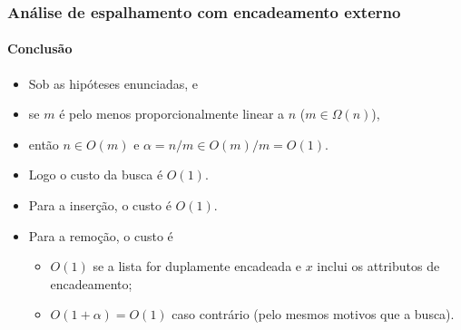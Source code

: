 \documentclass{beamer}
\begin{document}
\begin{frame}

  \frametitle{Análise de espalhamento com encadeamento externo}
  \framesubtitle{Conclusão}

  \begin{itemize}

  \item Sob as hipóteses enunciadas, e

  \item se $m$ é pelo menos proporcionalmente linear a $n$ ($m \in \Omega(n)$), 

  \item então $n \in O(m)$ e $\alpha = n/m \in O(m)/m = O(1)$.

  \item Logo o custo da busca é $O(1)$.

  \item Para a inserção, o custo é $O(1)$.

  \item Para a remoção, o custo é 

    \begin{itemize}

      \item $O(1)$ se a lista for duplamente encadeada e $x$ inclui os attributos de encadeamento;

      \item $O(1+\alpha) = O(1)$ caso contrário (pelo mesmos motivos que a busca).

    \end{itemize}

  \end{itemize}

\end{frame}
\end{document}
